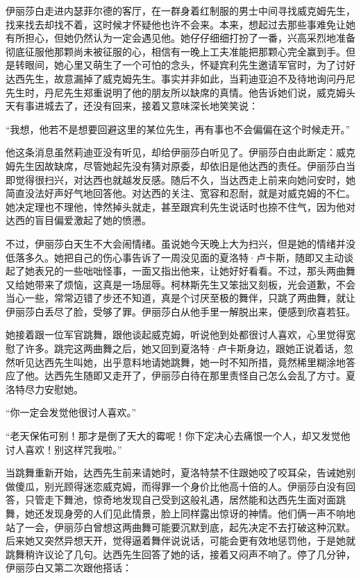 \par 伊丽莎白走进内瑟菲尔德的客厅，在一群身着红制服的男士中间寻找威克姆先生，找来找去却找不着，这时候才怀疑他也许不会来。本来，想起过去那些事难免让她有所担心，但她仍然认为一定会遇见他。她仔仔细细打扮了一番，兴高采烈地准备彻底征服他那颗尚未被征服的心，相信有一晚上工夫准能把那颗心完全赢到手。但是转眼间，她心里又萌生了一个可怕的念头，怀疑宾利先生邀请军官时，为了讨好达西先生，故意漏掉了威克姆先生。事实并非如此，当莉迪亚迫不及待地询问丹尼先生时，丹尼先生郑重说明了他的朋友所以缺席的真情。他告诉她们说，威克姆头天有事进城去了，还没有回来，接着又意味深长地笑笑说：
\par “我想，他若不是想要回避这里的某位先生，再有事也不会偏偏在这个时候走开。”
\par 他这条消息虽然莉迪亚没有听见，却给伊丽莎白听见了。伊丽莎白由此断定：威克姆先生因故缺席，尽管她起先没有猜对原委，却依旧是他达西的责任。伊丽莎白当即觉得很扫兴，对达西也就越发反感。随后不久，当达西走上前来向她问安时，她简直没法好声好气地回答他。对达西的关注、宽容和忍耐，就是对威克姆的不仁。她决定理也不理他，悻然掉头就走，甚至跟宾利先生说话时也捺不住气，因为他对达西的盲目偏爱激起了她的愤懑。
\par 不过，伊丽莎白天生不大会闹情绪。虽说她今天晚上大为扫兴，但是她的情绪并没低落多久。她把自己的伤心事告诉了一周没见面的夏洛特·卢卡斯，随即又主动谈起了她表兄的一些咄咄怪事，一面又指出他来，让她好好看看。不过，那头两曲舞又给她带来了烦恼，这真是一场屈辱。柯林斯先生又笨拙又刻板，光会道歉，不会当心一些，常常迈错了步还不知道，真是个讨厌至极的舞伴，只跳了两曲舞，就让伊丽莎白丢尽了脸，受够了罪。伊丽莎白从他手里一解脱出来，便感到欣喜若狂。
\par 她接着跟一位军官跳舞，跟他谈起威克姆，听说他到处都很讨人喜欢，心里觉得宽慰了许多。跳完这两曲舞之后，她又回到夏洛特·卢卡斯身边，跟她正说着话，忽然听见达西先生叫她，出乎意料地请她跳舞，她一时不知所措，竟然稀里糊涂地答应了他。达西先生随即又走开了，伊丽莎白待在那里责怪自己怎么会乱了方寸。夏洛特尽力安慰她。
\par “你一定会发觉他很讨人喜欢。”
\par “老天保佑可别！那才是倒了天大的霉呢！你下定决心去痛恨一个人，却又发觉他讨人喜欢！别这样咒我啦。”
\par 当跳舞重新开始，达西先生前来请她时，夏洛特禁不住跟她咬了咬耳朵，告诫她别做傻瓜，别光顾得迷恋威克姆，而得罪一个身价比他高十倍的人。伊丽莎白没有回答，只管走下舞池，惊奇地发现自己受到这般礼遇，居然能和达西先生面对面跳舞，她还发现身旁的人们见此情景，脸上同样露出惊讶的神情。他们俩一声不响地站了一会，伊丽莎白曾想这两曲舞可能要沉默到底，起先决定不去打破这种沉默。后来她又突然异想天开，觉得逼着舞伴说说话，可能会更有效地惩罚他，于是她就跳舞稍许议论了几句。达西先生回答了她的话，接着又闷声不响了。停了几分钟，伊丽莎白又第二次跟他搭话：

